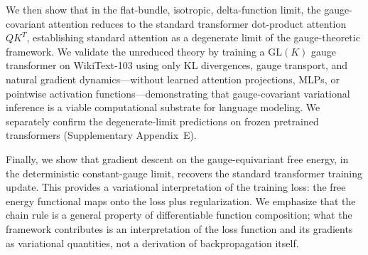\documentclass[twoside,11pt]{article}
\begin{document}
We then show that in the flat-bundle, isotropic, delta-function limit, the gauge-covariant attention reduces to the standard transformer dot-product attention $QK^T$, establishing standard attention as a degenerate limit of the gauge-theoretic framework. We validate the unreduced theory by training a $\mathrm{GL}(K)$ gauge transformer on WikiText-103 using only KL divergences, gauge transport, and natural gradient dynamics---without learned attention projections, MLPs, or pointwise activation functions---demonstrating that gauge-covariant variational inference is a viable computational substrate for language modeling. We separately confirm the degenerate-limit predictions on frozen pretrained transformers (Supplementary Appendix~E).

Finally, we show that gradient descent on the gauge-equivariant free energy, in the deterministic constant-gauge limit, recovers the standard transformer training update. This provides a variational interpretation of the training loss: the free energy functional maps onto the loss plus regularization. We emphasize that the chain rule is a general property of differentiable function composition; what the framework contributes is an interpretation of the loss function and its gradients as variational quantities, not a derivation of backpropagation itself.
\end{document}
